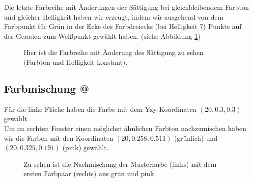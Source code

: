 \documentclass[11pt]{article}
\makeatletter
\newcommand*{\rom}[1]{\expandafter\@slowromancap\romannumeral #1@}
\makeatother
\begin{document}
Die letzte Farbreihe mit Änderungen der Sättigung bei gleichbleibendem Farbton und gleicher Helligkeit haben wir erzeugt, indem wir ausgehend von dem Farbpunkt für Grün in der Ecke des Farbdreiecks (bei Helligkeit $7$) Punkte auf der Geraden zum Weißpunkt gewählt haben. (siehe Abbildung \ref{saettigung_reihe})
\begin{figure}[H]
\caption{Hier ist die Farbreihe mit Änderung des Sättigung zu sehen (Farbton und Helligkeit konstant).}
\label{saettigung_reihe}
\end{figure}

\subsection{Farbmischung \rom{2}}
Für die linke Fläche haben die Farbe mit dem Yxy-Koordinaten $(20,0.3,0.3)$ gewählt. \\
Um im rechten Fenster einen möglichst ähnlichen Farbton nachzumischen haben wir die Farben mit den Koordinaten $(20,0.258, 0.511)$ (grünlich) und $(20,0.325, 0.191)$ (pink) gewählt. 


\begin{figure}[H]
\caption{Zu sehen ist die Nachmischung der Musterfarbe (links) mit dem ersten Farbpaar (rechts) aus grün und pink.}
\label{meta1}
\end{figure}
\end{document}
